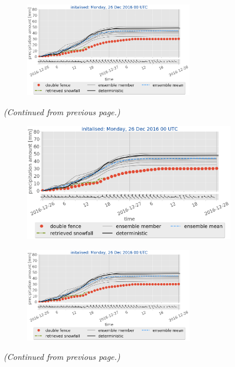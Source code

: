 \begin{figure}[H]
\begin{subfigure}[t]{0.85\textwidth}
		\caption{}\label{fig:sfc_acc25}
	\end{subfigure}
	\begin{subfigure}[t]{\textwidth}
		\centering
		\includegraphics[trim={1.2cm 0cm 1.1cm 21.4cm},clip,width=0.8\textwidth]{./fig_sfc_acc/acc_wind_20161226_00}
	\end{subfigure}
	\caption{\textit{(Continued from previous page.)} }
\end{figure}
\begin{figure}[H]\ContinuedFloat
	\centering
	\begin{subfigure}[t]{0.85\textwidth}	\includegraphics[trim={0.cm 3.6cm 0.cm 0cm},clip,width=\textwidth]{./fig_sfc_acc/acc_wind_20161226_00}
		\caption{}\label{fig:sfc_acc26}
	\end{subfigure}
	\begin{subfigure}[t]{\textwidth}
		\centering
		\includegraphics[trim={1.2cm 0cm 1.1cm 21.4cm},clip,width=0.8\textwidth]{./fig_sfc_acc/acc_wind_20161226_00}
	\end{subfigure}
	\caption{\textit{(Continued from previous page.)} }
\end{figure}
